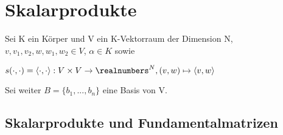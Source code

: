 \section{Skalarprodukte}%
\label{sp:sec:skalarprodukte}

Sei K ein Körper und V ein K-Vektorraum der Dimension N, $v, v_1, v_2, w, w_1, w_2 \in V$, $\alpha \in K$ sowie
\begin{center}
	$s(\cdot,\cdot) = \langle\cdot,\cdot\rangle: V \times V \rightarrow \realnumbers^N, (v, w) \mapsto \langle v, w\rangle$
\end{center}
Sei weiter $B = \{b_1, ..., b_n\}$ eine Basis von V.

\subsection{Skalarprodukte und Fundamentalmatrizen}%
\label{sp:sub:skalarprodukte_und_fundamentalmatrizen}

